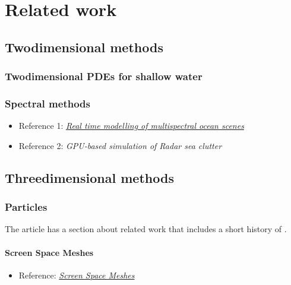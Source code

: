 \chapter{Related work}

\section{Twodimensional methods}

\subsection{Twodimensional PDEs for shallow water}

\subsection{Spectral methods}

\begin{itemize}
    \item Reference 1: \textit{\href{http://web1.see.asso.fr/ocoss2010/Session_4/20100531111216_Monnier_OCOSS2010-Paper_MERCUDA_item_2.pdf}{Real time modelling of multispectral ocean scenes}}
    \item Reference 2: \textit{GPU-based simulation of Radar sea clutter}
\end{itemize}

\section{Threedimensional methods}

\subsection{Particles}

The article \textit{} has a section about related work that includes a short history of \SPH.

\subsubsection{Screen Space Meshes}

\begin{itemize}
    \item Reference: \textit{\href{http://www.matthiasmueller.info/publications/screenSpaceMeshes.pdf}{Screen Space Meshes}}
\end{itemize}

